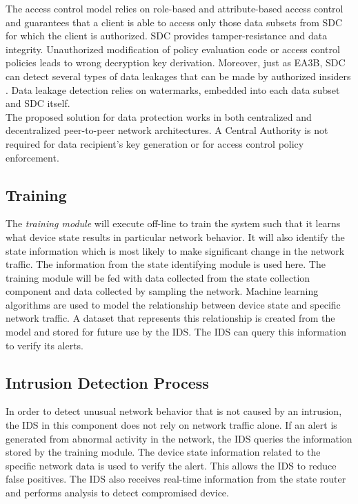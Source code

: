 \documentclass[conference]{IEEEtran}
\begin{document}
The access control model relies on role-based and attribute-based access control and guarantees that a client is able to access only those data subsets from SDC for which the client is authorized. SDC provides tamper-resistance and data integrity. Unauthorized modification of policy evaluation code or access control policies leads to wrong decryption key derivation. Moreover, just as EA3B, SDC can detect several types of data leakages that can be made by authorized insiders \cite{c6}. Data leakage detection relies on watermarks, embedded into each data subset and SDC itself. \\ 
The proposed solution for data protection works in both centralized and decentralized peer-to-peer network architectures. A Central Authority is not required for data recipient’s key generation or for access control policy enforcement.

\subsection{Training}
The {\em training module} will execute off-line to train the system such that it learns what device state results in particular network behavior. It will also identify the state information which is most likely to make significant change in the network traffic. The information from the state identifying module is used here. The training module will be fed with data collected from the state collection component and data collected by sampling the network. Machine learning algorithms are used to model the relationship between device state and specific network traffic. A dataset that represents this relationship is created from the model and stored for future use by the IDS. The IDS can query this information to verify its alerts.

\subsection{Intrusion Detection Process}
In order to detect unusual network behavior that is not caused by an intrusion, the IDS in this component does not rely on network traffic alone. If an alert is generated from abnormal activity in the network, the IDS queries the information stored by the training module. The device state information related to the specific network data is used to verify the alert. This allows the IDS to reduce false positives. The IDS also receives real-time information from the state router and performs analysis to detect compromised device. 
\end{document}
